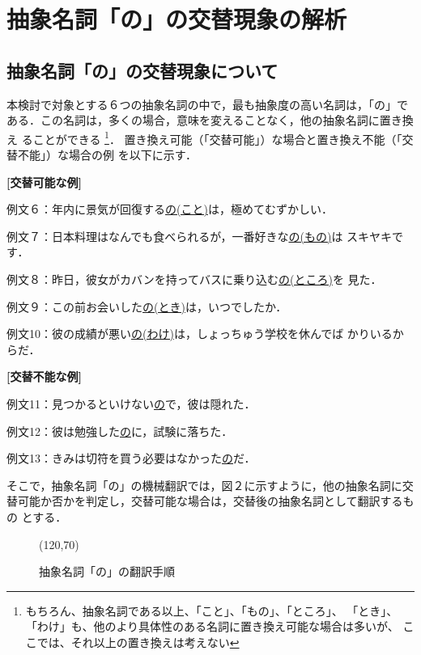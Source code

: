 \section{抽象名詞「の」の交替現象の解析}

\subsection{抽象名詞「の」の交替現象について}

本検討で対象とする６つの抽象名詞の中で，最も抽象度の高い名詞は，「の」で
ある．この名詞は，多くの場合，意味を変えることなく，他の抽象名詞に置き換え
ることができる
\footnote{もちろん、抽象名詞である以上、「こと」、「もの」、「ところ」、
「とき」、「わけ」も、他のより具体性のある名詞に置き換え可能な場合は多いが、
ここでは、それ以上の置き換えは考えない}．
置き換え可能（「交替可能」）な場合と置き換え不能（「交替不能」）な場合の例
を以下に示す．

\vspace{6pt}

{\bf [交替可能な例]}

例文６：年内に景気が回復する\underline{の(こと)}は，極めてむずかしい．

例文７：日本料理はなんでも食べられるが，一番好きな\underline{の(もの)}は
スキヤキです．

例文８：昨日，彼女がカバンを持ってバスに乗り込む\underline{の(ところ)}を
見た．

例文９：この前お会いした\underline{の(とき)}は，いつでしたか．

例文10：彼の成績が悪い\underline{の(わけ)}は，しょっちゅう学校を休んでば
かりいるからだ．

\vspace{6pt}

{\bf [交替不能な例]}

例文11：見つかるといけない\underline{の}で，彼は隠れた．

例文12：彼は勉強した\underline{の}に，試験に落ちた．

例文13：きみは切符を買う必要はなかった\underline{の}だ．

そこで，抽象名詞「の」の機械翻訳では，図２に示すように，他の抽象名詞に交
替可能か否かを判定し，交替可能な場合は，交替後の抽象名詞として翻訳するもの
とする．

\vspace{6pt}

\begin{figure}
\begin{center}
\atari(120,70)
\caption{抽象名詞「の」の翻訳手順}
\end{center}
\end{figure}


